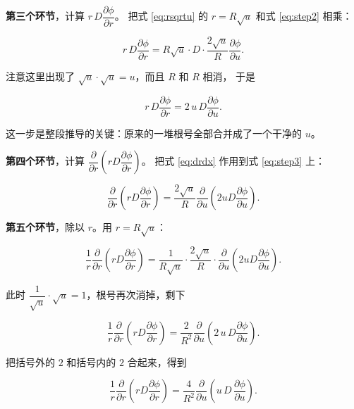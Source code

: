 \textbf{第三个环节}，计算 $r\,D\dfrac{\partial\phi}{\partial r}$。
把式 \eqref{eq:rsqrtu} 的 $r=R\sqrt{u}$ 和式 \eqref{eq:step2} 相乘：

\begin{equation}
r\,D\frac{\partial\phi}{\partial r}
= R\sqrt{u}\cdot D\cdot\frac{2\sqrt{u}}{R}\frac{\partial\phi}{\partial u}.
\end{equation}

注意这里出现了 $\sqrt{u}\cdot\sqrt{u}=u$，而且 $R$ 和 $R$ 相消，
于是

\begin{equation}
r\,D\frac{\partial\phi}{\partial r}
= 2\,u\,D\frac{\partial\phi}{\partial u}.
\label{eq:step3}
\end{equation}

这一步是整段推导的关键：原来的一堆根号全部合并成了一个干净的 $u$。

\textbf{第四个环节}，计算 $\dfrac{\partial}{\partial r}\left(rD\dfrac{\partial\phi}{\partial r}\right)$。
把式 \eqref{eq:drdx} 作用到式 \eqref{eq:step3} 上：

\begin{equation}
\frac{\partial}{\partial r}\left(rD\frac{\partial\phi}{\partial r}\right)
= \frac{2\sqrt{u}}{R}\frac{\partial}{\partial u}\left(2uD\frac{\partial\phi}{\partial u}\right).
\end{equation}

\textbf{第五个环节}，除以 $r$。用 $r=R\sqrt{u}$：

\begin{equation}
\frac{1}{r}\frac{\partial}{\partial r}\left(rD\frac{\partial\phi}{\partial r}\right)
= \frac{1}{R\sqrt{u}}\cdot\frac{2\sqrt{u}}{R}\cdot
\frac{\partial}{\partial u}\left(2uD\frac{\partial\phi}{\partial u}\right).
\end{equation}

此时 $\dfrac{1}{\sqrt{u}}\cdot\sqrt{u}=1$，根号再次消掉，剩下

\begin{equation}
\frac{1}{r}\frac{\partial}{\partial r}\left(rD\frac{\partial\phi}{\partial r}\right)
= \frac{2}{R^2}\frac{\partial}{\partial u}\left(2\,u\,D\frac{\partial\phi}{\partial u}\right).
\end{equation}

把括号外的 $2$ 和括号内的 $2$ 合起来，得到

\begin{equation}
\boxed{\;
\frac{1}{r}\frac{\partial}{\partial r}\left(rD\frac{\partial\phi}{\partial r}\right)
= \frac{4}{R^2}\frac{\partial}{\partial u}\left(u\,D\,\frac{\partial\phi}{\partial u}\right).
\;}
\label{eq:reg}
\end{equation}

